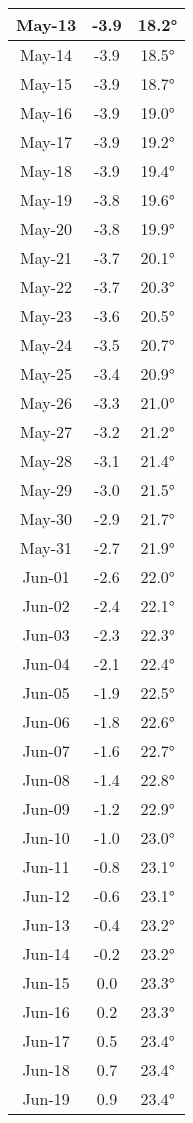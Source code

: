 \begin{footnotesize}
\begin{minipage}{0.33\textwidth}
\begin{tabular}[t]{c | c | c}
May-13 & -3.9 & 18.2°\\\hline
May-14 & -3.9 & 18.5°\\\hline
May-15 & -3.9 & 18.7°\\\hline
May-16 & -3.9 & 19.0°\\\hline
May-17 & -3.9 & 19.2°\\\hline
May-18 & -3.9 & 19.4°\\\hline
May-19 & -3.8 & 19.6°\\\hline
May-20 & -3.8 & 19.9°\\\hline
May-21 & -3.7 & 20.1°\\\hline
May-22 & -3.7 & 20.3°\\\hline
May-23 & -3.6 & 20.5°\\\hline
May-24 & -3.5 & 20.7°\\\hline
May-25 & -3.4 & 20.9°\\\hline
May-26 & -3.3 & 21.0°\\\hline
May-27 & -3.2 & 21.2°\\\hline
May-28 & -3.1 & 21.4°\\\hline
May-29 & -3.0 & 21.5°\\\hline
May-30 & -2.9 & 21.7°\\\hline
May-31 & -2.7 & 21.9°\\\hline
Jun-01 & -2.6 & 22.0°\\\hline
Jun-02 & -2.4 & 22.1°\\\hline
Jun-03 & -2.3 & 22.3°\\\hline
Jun-04 & -2.1 & 22.4°\\\hline
Jun-05 & -1.9 & 22.5°\\\hline
Jun-06 & -1.8 & 22.6°\\\hline
Jun-07 & -1.6 & 22.7°\\\hline
Jun-08 & -1.4 & 22.8°\\\hline
Jun-09 & -1.2 & 22.9°\\\hline
Jun-10 & -1.0 & 23.0°\\\hline
Jun-11 & -0.8 & 23.1°\\\hline
Jun-12 & -0.6 & 23.1°\\\hline
Jun-13 & -0.4 & 23.2°\\\hline
Jun-14 & -0.2 & 23.2°\\\hline
Jun-15 & 0.0 & 23.3°\\\hline
Jun-16 & 0.2 & 23.3°\\\hline
Jun-17 & 0.5 & 23.4°\\\hline
Jun-18 & 0.7 & 23.4°\\\hline
Jun-19 & 0.9 & 23.4°\\\hline

\end{tabular}
\end{minipage}
\end{footnotesize}
